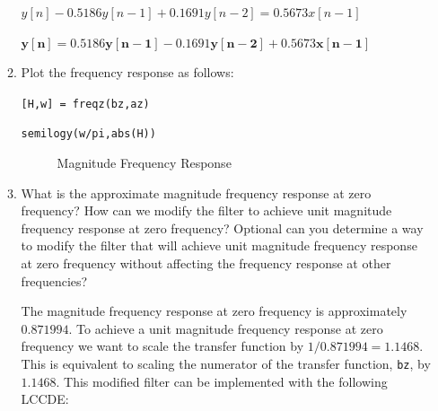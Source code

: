 \documentclass[fleqn]{article}
\begin{document}
\begin{enumerate}[nolistsep]
\begin{enumerate}[nolistsep]
				$y[n] - 0.5186y[n-1] + 0.1691y[n-2] = 0.5673x[n-1]$
				
				$\mathbf{y[n] = 0.5186y[n-1] - 0.1691y[n-2] + 0.5673x[n-1]}$
				
			\item Plot the frequency response as follows:
			
				\texttt{[H,w] = freqz(bz,az)}
				
				\texttt{semilogy(w/pi,abs(H))}
				
				\begin{figure}[H]
					\centerline{}
					\caption{Magnitude Frequency Response}
				\end{figure}
				
			\item What is the approximate magnitude frequency response at zero frequency? How can we modify the filter to achieve unit magnitude frequency response at zero frequency? Optional can you determine a way to modify the filter that will achieve unit magnitude frequency response at zero frequency without affecting the frequency response at other frequencies?
			
				The magnitude frequency response at zero frequency is approximately $0.871994$. To achieve a unit magnitude frequency response at zero frequency we want to scale the transfer function by $1/0.871994 = 1.1468$. This is equivalent to scaling the numerator of the transfer function, \texttt{bz}, by $1.1468$. This modified filter can be implemented with the following LCCDE:
				

\end{enumerate}
\end{enumerate}
\end{document}
